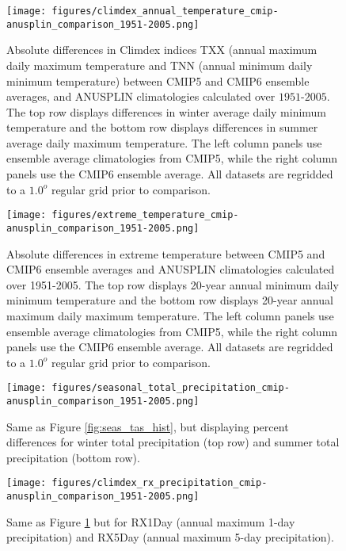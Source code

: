 \documentclass[]{scrartcl}
\begin{document}
\begin{figure}[!ht]
	\centering
	\texttt{[image: figures/climdex\_annual\_temperature\_cmip-anusplin\_comparison\_1951-2005.png]}
	\caption[Tas]{Absolute differences in Climdex indices TXX (annual maximum daily maximum temperature and TNN (annual minimum daily minimum temperature) between CMIP5 and CMIP6 ensemble averages, and ANUSPLIN climatologies calculated over $1951$-$2005$. The top row displays differences in winter average daily minimum temperature and the bottom row displays differences in summer average daily maximum temperature. The left column panels use ensemble average climatologies from CMIP5, while the right column panels use the CMIP6 ensemble average. All datasets are regridded to a $1.0^o$ regular grid prior to comparison.}
	\label{fig:climdex_tas_hist}
\end{figure}

\begin{figure}[ht!]
	\centering
	\texttt{[image: figures/extreme\_temperature\_cmip-anusplin\_comparison\_1951-2005.png]}
	\caption[Tas]{Absolute differences in extreme temperature between CMIP5 and CMIP6 ensemble averages and ANUSPLIN climatologies calculated over 1951-2005. The top row displays 20-year annual minimum daily minimum temperature and the bottom row displays 20-year annual maximum daily maximum temperature. The left column panels use ensemble average climatologies from CMIP5, while the right column panels use the CMIP6 ensemble average. All datasets are regridded to a $1.0^o$ regular grid prior to comparison.}
	\label{fig:ext_tas_hist}
\end{figure}

\begin{figure}[ht!]
	\centering
	\texttt{[image: figures/seasonal\_total\_precipitation\_cmip-anusplin\_comparison\_1951-2005.png]}
	\caption[Pr]{Same as Figure \ref{fig:seas_tas_hist}, but displaying percent differences for winter total precipitation (top row) and summer total precipitation (bottom row).}
	\label{fig:seas_pr_hist}
\end{figure}


\begin{figure}[ht!]
	\centering
	\texttt{[image: figures/climdex\_rx\_precipitation\_cmip-anusplin\_comparison\_1951-2005.png]}
	\caption[Tas]{Same as Figure \ref{fig:climdex_tas_hist} but for RX1Day (annual maximum 1-day precipitation) and RX5Day (annual maximum 5-day precipitation).}
	\label{fig:climdex_pr_hist}
\end{figure}
\end{document}

